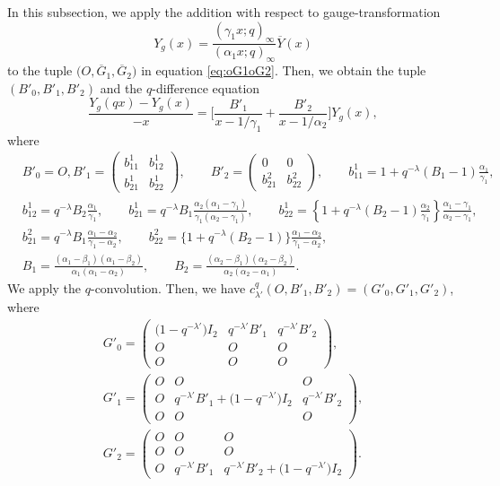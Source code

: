 \documentclass[pdftex]{sigma}
\numberwithin{equation}{section}
\theoremstyle{definition}
\begin{document}
In this subsection, we apply the addition with respect to gauge-transformation
\begin{equation}
 Y_g(x) = \frac{(\gamma_1 x;q)_{\infty}}{(\alpha_1 x;q)_{\infty}}\overline{Y}(x)
\label{eq:Ygdeg2-1}
\end{equation}
to the tuple $\bigl(O, \overline{G}_1, \overline{G}_2 \bigr) $ in equation \eqref{eq:oG1oG2}.
Then, we obtain the tuple $(B'_0, B'_1, B'_2 ) $ and the $q$-difference equation
\begin{equation} \label{eq:B'1B'2gm1}
\frac{Y_g(qx) - Y_g(x)}{-x} = \bigg[ \frac{B'_1}{x-1/\gamma_1} + \frac{B'_2}{x-1/\alpha_2} \bigg] Y_g(x) ,
\end{equation}
where
\begin{align*}
& B'_0 = O, B'_1
= \begin{pmatrix}
 b^1_{11} & b^1_{12} \\
 b^1_{21} & b^1_{22}
 \end{pmatrix},\qquad
 B'_2
= \begin{pmatrix}
 0 & 0 \\
 b^2_{21} & b^2_{22}
\end{pmatrix}
, \qquad b^1_{11} = 1 + q^{- \lambda} (B_1 - 1) \frac{\alpha_1 }{\gamma_1 },
\\
& b^1_{12} = q^{-\lambda} B_2 \frac{\alpha_1 }{\gamma_1}, \qquad b^1_{21} = q^{-\lambda} B_1 \frac{\alpha_2(\alpha_1 - \gamma_1)}{\gamma_1(\alpha_2 - \gamma_1)} ,\qquad b^1_{22} = \left\{1 + q^{-\lambda} (B_2 - 1) \frac{\alpha_2 }{\gamma_1} \right\} \frac{\alpha_1 - \gamma_1}{\alpha_2 - \gamma_1} , \\
& b^2_{21} = q^{- \lambda} B_1 \frac{\alpha_1-\alpha_2}{\gamma_1-\alpha_2},\qquad b^2_{22} = \bigl\{ 1 + q^{-\lambda} (B_2- 1) \bigr\} \frac{\alpha_1-\alpha_2}{\gamma_1-\alpha_2} , \\
& B_1=\frac{(\alpha_1-\beta_1)(\alpha_1-\beta_2)}{\alpha_1(\alpha_1-\alpha_2)},\qquad B_2=\frac{(\alpha_2-\beta_1)(\alpha_2-\beta_2)}{\alpha_2(\alpha_2-\alpha_1)}.
\end{align*}
We apply the $q$-convolution.
Then, we have $c^q_{\lambda'} (O, B'_1, B'_2) = (G'_0, G'_1, G'_2)$, where
\begin{gather}
G'_0
= \begin{pmatrix}
 \bigl(1 - q^{-\lambda'}\bigr)I_2 & q^{-\lambda '} B'_1 & q^{-\lambda '} B'_2\\
 O & O & O \\
 O & O & O
\end{pmatrix},\nonumber \\
G'_1
= \begin{pmatrix}
 O & O & O \\
 O & q^{-\lambda'} B'_1 + \bigl(1-q^{-\lambda'}\bigr) I_2 & q^{-\lambda'} B'_2 \\
 O & O & O
\end{pmatrix},\nonumber \\
G'_2
= \begin{pmatrix}
 O & O & O \\
 O & O & O \\
 O & q^{-\lambda'} B'_1 & q^{-\lambda'} B'_2 + \bigl(1-q^{-\lambda'}\bigr) I_2
\end{pmatrix}.\label{eq:G'012}
\end{gather}
\end{document}
